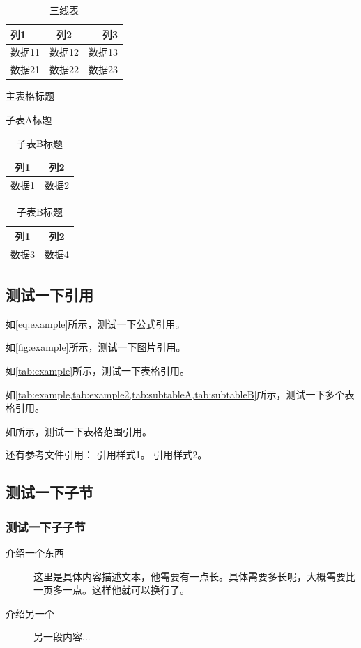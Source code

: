 \begin{table}[htbp]
    \centering
    \caption{三线表}
    \begin{tabularx}{0.8\linewidth}{LCR}
        \toprule
        列1   & 列2   & 列3   \\
        \midrule
        数据11 & 数据12 & 数据13 \\
        数据21 & 数据22 & 数据23 \\
        \bottomrule
    \end{tabularx}
    \label{tab:example2}
\end{table}

\begin{table}[htbp]
    \centering
    \caption{主表格标题}
    \begin{subtable}[t]{0.45\textwidth}
        \centering
        \caption{子表A标题}
        \label{tab:subtableA}
        \begin{tabular}{|c|c|}
            \hline
            列1 & 列2 \\ \hline
            数据1 & 数据2 \\ \hline
        \end{tabular}
    \end{subtable}
    \hfill
    \begin{subtable}[t]{0.45\textwidth}
        \centering
        \caption{子表B标题}
        \label{tab:subtableB}
        \begin{tabular}{|c|c|}
            \hline
            列1 & 列2 \\ \hline
            数据3 & 数据4 \\ \hline
        \end{tabular}
    \end{subtable}
\end{table}

\subsection{测试一下引用}

如\cref{eq:example}所示，测试一下公式引用。

如\cref{fig:example}所示，测试一下图片引用。

如\cref{tab:example}所示，测试一下表格引用。

如\cref{tab:example,tab:example2,tab:subtableA,tab:subtableB}所示，测试一下多个表格引用。

如所示，测试一下表格范围引用。

还有参考文件引用：
引用样式1\cite{example2025}。
引用样式2\parencite{example2025}。

\subsection{测试一下子节}
\subsubsection{测试一下子子节}

\begin{description}
    \item[介绍一个东西] 这里是具体内容描述文本，他需要有一点长。具体需要多长呢，大概需要比一页多一点。这样他就可以换行了。
    \item[介绍另一个] 另一段内容...
\end{description}